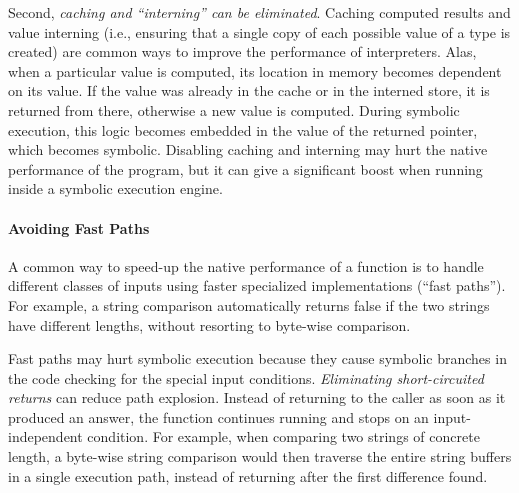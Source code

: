Second, \emph{caching and ``interning'' can be eliminated}.  Caching computed results and value interning (i.e., ensuring that a single copy of each possible value of a type is created) are common ways to improve the performance of interpreters.  Alas, when a particular value is computed, its location in memory becomes dependent on its value. If the value was already in the cache or in the interned store, it is returned from there, otherwise a new value is computed.  During symbolic execution, this logic becomes embedded in the value of the returned pointer, which becomes symbolic.  Disabling caching and interning may hurt the native performance of the program, but it can give a significant boost when running inside a symbolic execution engine.

\paragraph{Avoiding Fast Paths}

A common way to speed-up the native performance of a function is to handle different classes of inputs using faster specialized implementations (``fast paths'').  For example, a string comparison automatically returns false if the two strings have different lengths, without resorting to byte-wise comparison.

Fast paths may hurt symbolic execution because they cause symbolic branches in the code checking for the special input conditions.  \emph{Eliminating short-circuited returns} can reduce path explosion.  Instead of returning to the caller as soon as it produced an answer, the function continues running and stops on an input-independent condition.  For example, when comparing two strings of concrete length, a byte-wise string comparison would then traverse the entire string buffers in a single execution path, instead of returning after the first difference found.



